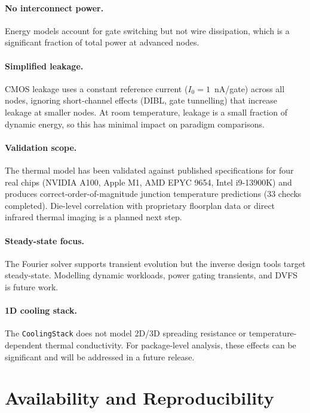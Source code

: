 \documentclass[11pt,twocolumn]{article}
\begin{document}
\paragraph{No interconnect power.}
Energy models account for gate switching but not wire dissipation,
which is a significant fraction of total power at advanced nodes.

\paragraph{Simplified leakage.}
CMOS leakage uses a constant reference current ($I_0 = 1$~nA/gate)
across all nodes, ignoring short-channel effects (DIBL, gate tunnelling)
that increase leakage at smaller nodes. At room temperature, leakage is
a small fraction of dynamic energy, so this has minimal impact on
paradigm comparisons.

\paragraph{Validation scope.}
The thermal model has been validated against published specifications for four
real chips (NVIDIA A100, Apple M1, AMD EPYC 9654, Intel i9-13900K) and
produces correct-order-of-magnitude junction temperature predictions
(33 checks completed). Die-level correlation with proprietary floorplan
data or direct infrared thermal imaging is a planned next step.

\paragraph{Steady-state focus.}
The Fourier solver supports transient evolution but the inverse design
tools target steady-state. Modelling dynamic workloads, power gating
transients, and DVFS is future work.

\paragraph{1D cooling stack.}
The \texttt{CoolingStack} does not model 2D/3D spreading resistance
or temperature-dependent thermal conductivity. For package-level
analysis, these effects can be significant and will be addressed in a
future release.


\section{Availability and Reproducibility}
\label{sec:availability}
\end{document}
